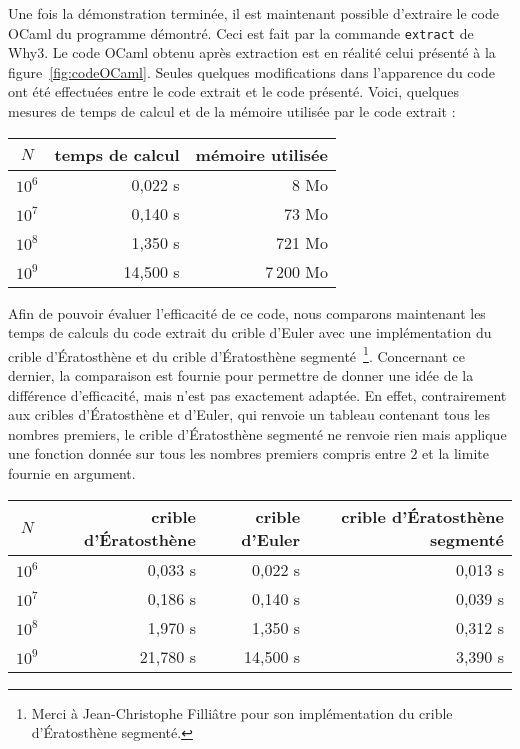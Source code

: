 \documentclass[a4paper]{easychair}
\begin{document}
Une fois la démonstration terminée, il est maintenant possible d'extraire
le code OCaml du programme démontré. Ceci est fait par la commande
\texttt{extract} de Why3.
Le code OCaml obtenu après extraction est en réalité celui présenté
à la figure~\ref{fig:codeOCaml}.
Seules quelques modifications dans l'apparence du code ont été effectuées
entre le code extrait et le code présenté.
Voici, quelques mesures de temps de calcul et de la mémoire utilisée par
le code extrait :
\begin{center}
  \begin{tabular}{|c|r|r|}
    \hline
    $N$ & temps de calcul & mémoire utilisée \\
    \hline\hline
    $10^6$ &  0,022 s &      8 Mo \\\hline
    $10^7$ &  0,140 s &     73 Mo \\\hline
    $10^8$ &  1,350 s &    721 Mo \\\hline
    $10^9$ & 14,500 s & 7\,200 Mo \\\hline
  \end{tabular}
\end{center}


Afin de pouvoir évaluer l'efficacité de ce code, nous comparons maintenant
les temps de calculs du code extrait du crible d'Euler avec une
implémentation du crible d'Ératosthène et du crible d'Ératosthène
segmenté~\footnote{Merci à
  Jean-Christophe Filliâtre pour son implémentation du crible d'Ératosthène
  segmenté.}.
Concernant ce dernier, la comparaison est fournie pour permettre de donner
une idée de la différence d'efficacité, mais n'est pas exactement adaptée.
En effet, contrairement aux cribles d'Ératosthène et d'Euler, qui renvoie
un tableau contenant tous les nombres premiers, le crible d'Ératosthène
segmenté ne renvoie rien mais applique une fonction donnée sur tous les
nombres premiers compris entre $2$ et la limite fournie en argument.
\begin{center}
  \begin{tabular}{|c|r|r|r|}
    \hline
    $N$ & crible d'Ératosthène & crible d'Euler &
    \multicolumn{1}{|p{3.1cm}|}{crible d'Ératosthène segmenté}\\
    \hline\hline
    $10^6$ &  0,033 s &  0,022 s &  0,013 s \\\hline
    $10^7$ &  0,186 s &  0,140 s &  0,039 s \\\hline
    $10^8$ &  1,970 s &  1,350 s &  0,312 s \\\hline
    $10^9$ & 21,780 s & 14,500 s &  3,390 s \\\hline
  \end{tabular}
\end{center}
\end{document}
